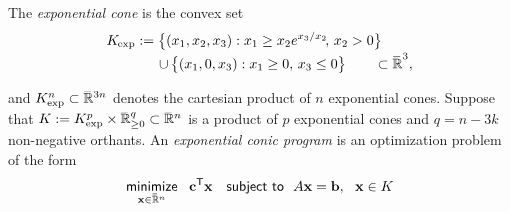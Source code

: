 \documentclass{article}
\newcommand\discard[1]{}
\newcommand\voli[1]{{\color{olicolor}\textbf{$\boldsymbol\{$Oli: }#1 \textbf{$\boldsymbol\}$}}}
\begin{document}
The \emph{exponential cone} is the convex set
\begin{align*}
        \begin{aligned}
        K_{\mskip-1mu\exp} :=
        \big\{ (x_1, x_2, x_3) &:
                x_1 \ge x_2 e^{x_3 / x_2}\!,\, x_2 > 0 \big\}
            \\[-0.4ex]\quad \mathbin{\cup}\,
        \big\{ (x_1, 0, x_3&) : x_1 \ge 0,\, x_3 \le 0 \big\}
        \qquad \subset \mathbb {\mskip1mu\overline{\mskip-1mu\mathbb R\!}\,}^3,
    \end{aligned}
\end{align*}
\discard{\voli{It is also sometimes called the ``relative entropy'' cone, because if $\mat m, \mat p \in \Delta^{n-1} \subset \mathbb R^n$ are points on a probability simplex, then $(-\mat u, \mat m, \mat p) \in K_{\exp}^n$ if and only if $\mat u$ is an upper bound on $\mat m \log (\nicefrac{\mat m}{\mat p})$, the pointwise contribution to relative entropy at each outcome.}}
%
and
$K_{\exp}^n \subset \smash{\mskip1mu\overline{\mskip-1mu\mathbb R\!}\,}\vphantom{R}^{3n}$ denotes the cartesian product
of $n$ exponential cones. 
Suppose that $K :=  K_{\exp}^p \times \smash{\mskip1mu\overline{\mskip-1mu\mathbb R\!}\,}_{\ge 0}^{q}
\subset \smash{\mskip1mu\overline{\mskip-1mu\mathbb R\!}\,}^n$ is a product of $p$ exponential cones and $q = n - 3k$ non-negative orthants.
An \emph{exponential conic program} is an optimization problem of the form
\begin{equation}
    \mathop{\text{\sf minimize}}
        \limits_{\mathbf{x} \in \mskip1mu\overline{\mskip-1mu\mathbb R\!}\,^{n}}
        ~~ \mathbf{c}^{\sf T} \mathbf{x}
    \quad\text{\sf subject to}~~ A \mathbf{x} = \mathbf{b},~~\mathbf{x} \in 
        K
        \label{eq:exp-conic-program}
\end{equation}
\end{document}
